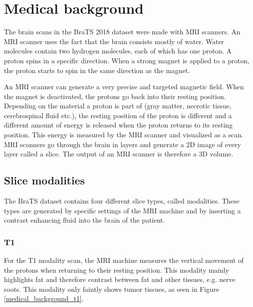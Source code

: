 \section{Medical background}
The brain scans in the BraTS\cite{menze2015multimodal} 2018 dataset were made with MRI scanners\cite{mriscanner}. 
An MRI scanner uses the fact that the brain consists mostly of water. Water molecules contain two hydrogen molecules,
each of which has one proton. A proton spins in a specific direction. When a strong magnet is applied to a proton, the proton starts to spin in the same direction as the magnet. 

An MRI scanner can generate a very precise and targeted magnetic field. When the magnet is deactivated, the protons go back into their resting position. Depending on the material a proton is part of (gray matter, necrotic tissue, cerebrospinal fluid  etc.), the resting position of the proton is different and a different amount of energy is released when the proton returns to its resting position. This energy is measured by the MRI scanner and visualized as a scan. MRI scanners go through the brain in layers and generate a 2D image of every layer called a slice. The output of an MRI scanner is therefore a 3D volume.

\subsection{Slice modalities}
The BraTS dataset contains four different slice types, called modalities. These types are generated by specific settings of the MRI machine and by inserting a contrast enhancing fluid into the brain of the patient.

\subsubsection{T1}
For the T1 modality scan, the MRI machine measures the vertical movement of the protons when returning to their resting position. This modality mainly highlights fat and therefore contrast between fat and other tissues, e.g. nerve roots\cite{mriquora}. This modality only faintly shows tumor tissues, as seen in Figure \ref{medical_background_t1}.

